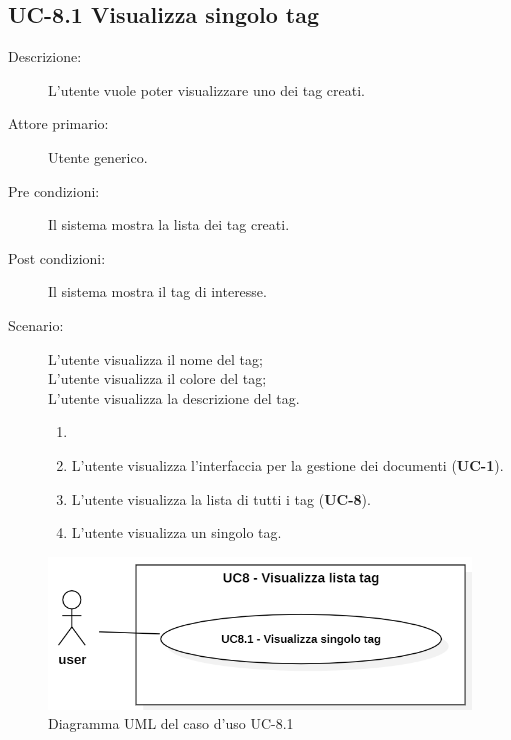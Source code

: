\subsection{UC-8.1 Visualizza singolo tag}
\begin{description}
    \item[Descrizione:] L’utente vuole poter visualizzare uno dei tag creati.
    \item[Attore primario:] Utente generico.
    \item[Pre condizioni:] Il sistema mostra la lista dei tag creati.
    \item[Post condizioni:] Il sistema mostra il tag di interesse.
    \item[Scenario:] L'utente visualizza il nome del tag;\\L'utente visualizza il colore del tag;\\L'utente visualizza la descrizione del tag.
    \begin{enumerate}
        \item[] 
        \item L’utente visualizza l'interfaccia per la gestione dei documenti (\textbf{UC-1}).
        \item L’utente visualizza la lista di tutti i tag (\textbf{UC-8}).
        \item L'utente visualizza un singolo tag.
    \end{enumerate}
\end{description}

\begin{figure}[H]
    \centering
    \includegraphics[width=0.8\linewidth]{UC8.1.PNG}
    \caption{Diagramma UML del caso d'uso UC-8.1}
    \label{fig:UC8.10}
\end{figure}
